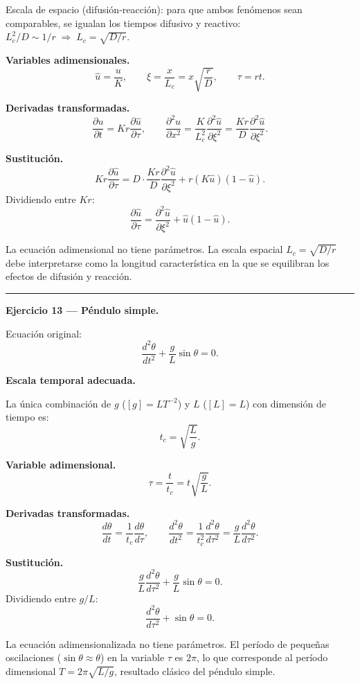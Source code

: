 \documentclass[12pt,letterpaper]{article}
\begin{document}
Escala de espacio (difusión-reacción): para que ambos fenómenos sean comparables,
se igualan los tiempos difusivo y reactivo:
$L_c^2/D\sim 1/r\;\Rightarrow\; L_c=\sqrt{D/r}$.

\textbf{Variables adimensionales.}
\[
  \hat{u}=\frac{u}{K},\qquad
  \xi=\frac{x}{L_c}=x\sqrt{\frac{r}{D}},\qquad
  \tau=rt.
\]

\textbf{Derivadas transformadas.}
\[
  \frac{\partial u}{\partial t}=Kr\frac{\partial\hat{u}}{\partial\tau},\qquad
  \frac{\partial^2 u}{\partial x^2}=\frac{K}{L_c^2}\frac{\partial^2\hat{u}}{\partial\xi^2}
  =\frac{Kr}{D}\frac{\partial^2\hat{u}}{\partial\xi^2}.
\]

\textbf{Sustitución.}
\[
  Kr\frac{\partial\hat{u}}{\partial\tau}
  =D\cdot\frac{Kr}{D}\frac{\partial^2\hat{u}}{\partial\xi^2}
  +r(K\hat{u})\!\left(1-\hat{u}\right).
\]
Dividiendo entre $Kr$:
\[
  \boxed{\frac{\partial\hat{u}}{\partial\tau}
  =\frac{\partial^2\hat{u}}{\partial\xi^2}+\hat{u}(1-\hat{u}).}
\]

La ecuación adimensional no tiene parámetros.
La escala espacial $L_c=\sqrt{D/r}$ debe interpretarse como la longitud
característica en la que se equilibran los efectos de difusión y reacción.

\bigskip
\noindent\rule{\textwidth}{0.3pt}
\bigskip

\noindent\textbf{Ejercicio 13 — Péndulo simple.}

Ecuación original:
\[
  \frac{d^2\theta}{dt^2}+\frac{g}{L}\sin\theta=0.
\]

\textbf{Escala temporal adecuada.}

La única combinación de $g$ ($[g]=LT^{-2}$) y $L$ ($[L]=L$)
con dimensión de tiempo es:
\[
  t_c=\sqrt{\frac{L}{g}}.
\]

\textbf{Variable adimensional.}
\[
  \tau=\frac{t}{t_c}=t\sqrt{\frac{g}{L}}.
\]

\textbf{Derivadas transformadas.}
\[
  \frac{d\theta}{dt}=\frac{1}{t_c}\frac{d\theta}{d\tau},\qquad
  \frac{d^2\theta}{dt^2}=\frac{1}{t_c^2}\frac{d^2\theta}{d\tau^2}=\frac{g}{L}\frac{d^2\theta}{d\tau^2}.
\]

\textbf{Sustitución.}
\[
  \frac{g}{L}\frac{d^2\theta}{d\tau^2}+\frac{g}{L}\sin\theta=0.
\]
Dividiendo entre $g/L$:
\[
  \boxed{\frac{d^2\theta}{d\tau^2}+\sin\theta=0.}
\]

La ecuación adimensionalizada no tiene parámetros.
El período de pequeñas oscilaciones ($\sin\theta\approx\theta$)
en la variable $\tau$ es $2\pi$, lo que corresponde al período dimensional
$T=2\pi\sqrt{L/g}$, resultado clásico del péndulo simple.
\end{document}
